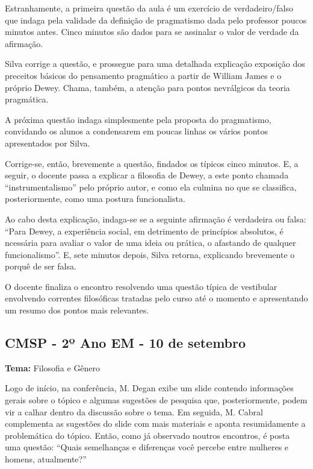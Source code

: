 \documentclass[12pt,a4paper]{article}
\begin{document}
	Estranhamente, a primeira questão da aula é um exercício 
	de verdadeiro/falso que indaga pela validade da definição 
	de pragmatismo dada pelo professor poucos minutos antes. 
	Cinco minutos são dados para se assinalar o valor de verdade 
	da afirmação. 

	Silva corrige a questão, e prossegue para uma detalhada 
	explicação exposição dos preceitos básicos do pensamento 
	pragmático a partir de William James e o próprio Dewey. 
	Chama, também, a atenção para pontos nevrálgicos 
	da teoria pragmática. 

	A próxima questão indaga simplesmente pela proposta do 
	pragmatismo, convidando os alunos a condensarem em poucas 
	linhas os vários pontos apresentados por Silva. 

	Corrige-se, então, brevemente a questão, findados os típicos 
	cinco minutos. E, a seguir, o docente passa a explicar a 
	filosofia de Dewey, a este ponto chamada “instrumentalismo” 
	pelo próprio autor, e como ela culmina no que se classifica, 
	posteriormente, como uma postura funcionalista. 

	Ao cabo desta explicação, indaga-se se a seguinte afirmação 
	é verdadeira ou falsa: “Para Dewey, a experiência social, em 
	detrimento de princípios absolutos, é ncessária para avaliar 
	o valor de uma ideia ou prática, o afastando de qualquer 
	funcionalismo”. E, sete minutos depois, Silva retorna, 
	explicando brevemente o porquê de ser falsa. 

	O docente finaliza o encontro resolvendo uma questão típica 
	de vestibular envolvendo correntes filosóficas tratadas pelo 
	curso até o momento e apresentando um resumo dos pontos 
	mais relevantes. 

	\subsection{CMSP - 2º Ano EM - 10 de setembro}

	\textbf{Tema:} Filosofia e Gênero

	Logo de início, na conferência, M. Degan exibe um slide contendo 
	informações gerais sobre o tópico e algumas sugestões de pesquisa 
	que, posteriormente, podem vir a calhar dentro da discussão sobre 
	o tema. Em seguida, M. Cabral complementa as sugestões do slide 
	com mais materiais e aponta resumidamente a problemática do tópico. 
	Então, como já observado noutros encontros, é posta uma questão: 
	“Quais semelhanças e diferenças você percebe entre mulheres e 
	homens, atualmente?”
\end{document}
